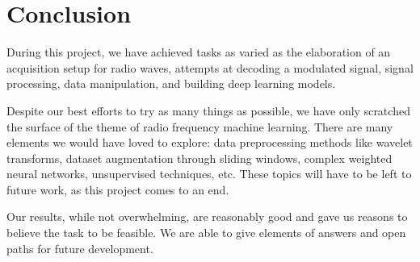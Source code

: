 \section{Conclusion}

During this project, we have achieved tasks as varied as the elaboration of an acquisition setup for radio waves, attempts at decoding a modulated signal, signal processing, data manipulation, and building deep learning models.

Despite our best efforts to try as many things as possible, we have only scratched the surface of the theme of radio frequency machine learning. There are many elements we would have loved to explore: data preprocessing methods like wavelet transforms, dataset augmentation through sliding windows, complex weighted neural networks, unsupervised techniques, etc. These topics will have to be left to future work, as this project comes to an end.

Our results, while not overwhelming, are reasonably good and gave us reasons to believe the task to be feasible. We are able to give elements of answers and open paths for future development.
